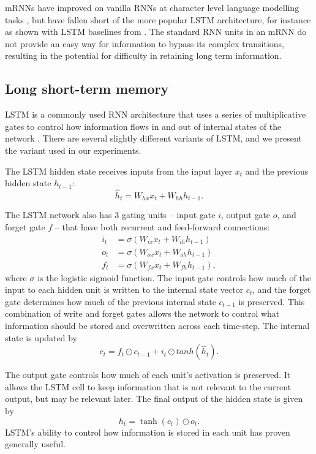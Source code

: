 \documentclass{article}
\begin{document}
mRNNs have improved on vanilla RNNs at character level language modelling tasks \citep{Sutskever-2011,mikolov2012c}, but have fallen short of the more popular LSTM architecture, for instance as shown with LSTM baselines from \citep{cooijmans2017}. The standard RNN units in an mRNN do not provide an easy way for information to bypass its complex transitions, resulting in the potential for difficulty in retaining long term information.


\subsection{Long short-term memory}
LSTM is a commonly used RNN architecture that uses a series of multiplicative gates to control how information flows in and out of internal states of the network \citep{Hochreiter-1997}. There are several slightly different variants of LSTM, and we present the variant used in our experiments. 

The LSTM hidden state receives inputs from the input layer $x_t$ and the previous hidden state $h_{t-1}$:
\begin{equation}
\hat{h}_t= W_{hx}x_t + W_{hh}h_{t-1}.
\end{equation}

 The LSTM network also has 3 gating units -- input gate $i$, output gate $o$, and forget gate $f$ -- that have both recurrent and feed-forward connections:
\begin{align}
i_t &= \sigma(W_{ix}x_t + W_{ih}h_{t-1}) \\
o_t &= \sigma(W_{ox}x_t + W_{oh}h_{t-1}) \\
f_t &= \sigma(W_{fx}x_t + W_{fh}h_{t-1}),
\end{align}
where $\sigma$ is the logistic sigmoid function. The input gate controls how much of the input to each hidden unit is written to the internal state vector $c_t$, and the forget gate determines how much of the previous internal state $c_{t-1}$ is preserved. This combination of write and forget gates allows the network to control what information should be stored and overwritten across each time-step. The internal state is updated by
\begin{equation}
c_{t} = f_t \odot c_{t-1} + i_t \odot tanh(\hat{h}_t).
\end{equation}

The output gate controls how much of each unit's activation is preserved. It allows the LSTM cell to keep information that is not relevant to the current output, but may be relevant later. The final output of the hidden state is given by
\begin{equation}
  h_t = \tanh(c_t)\odot o_t.
\end{equation}
LSTM's ability to control how information is stored in each unit has proven generally useful.
\end{document}
